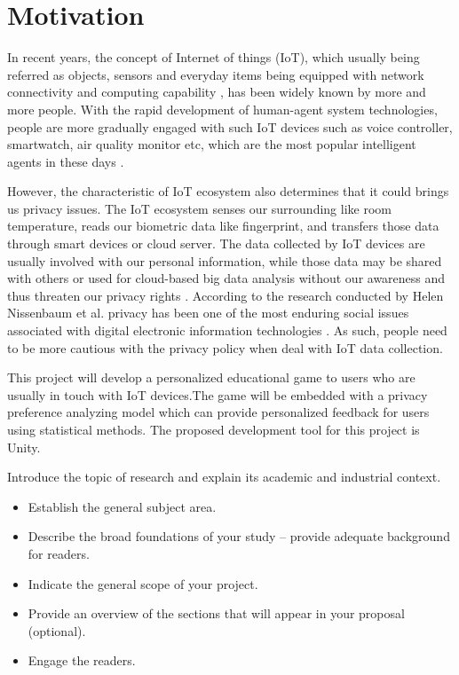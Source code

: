 \documentclass[a4paper,11pt]{article}
\begin{document}
\setcounter{page}{1}                            %
\footruleheight{1pt}
\headruleheight{1pt}
\rhead{- \thepage}
\cfoot{}
%


\section{Motivation}

In recent years, the concept of Internet of things (IoT), which usually being referred as objects, sensors and everyday items being equipped with network connectivity and 
computing capability \cite{IoT}, has been widely known by more and more people. With the rapid development of human-agent system technologies, people are more gradually engaged with such IoT devices such as voice controller, smartwatch, air quality monitor etc, which are the most popular intelligent agents in these days \cite{IoTdevice}. 

However, the characteristic of IoT ecosystem also determines that it could brings us privacy issues. The IoT ecosystem senses our surrounding like room temperature, reads our biometric data like fingerprint, and transfers those data through smart devices or cloud server. The data collected by IoT devices are usually involved with our personal information, while those data may be shared with others or used for cloud-based big data analysis without our awareness and thus threaten our privacy rights \cite{bigdata}. According to the research conducted by Helen Nissenbaum et al. privacy has been one of the most enduring social issues associated with digital electronic information technologies \cite{privacy}. As such, people need to be more cautious with the privacy policy when deal with IoT data collection.

This project will develop a personalized educational game to users who are usually in touch with IoT devices.The game will be embedded with a privacy preference analyzing model which can provide personalized feedback for users using statistical methods. The proposed development tool for this project is Unity.

\if
Introduce the topic of research and explain its academic and industrial context.

\begin{itemize}
    \item Establish the general subject area.
    \item Describe the broad foundations of your study -- provide adequate background for readers.
    \item Indicate the general scope of your project.
    \item Provide an overview of the sections that will appear in your proposal (optional).
    \item Engage the readers.
\end{itemize}
\fi
\end{document}
